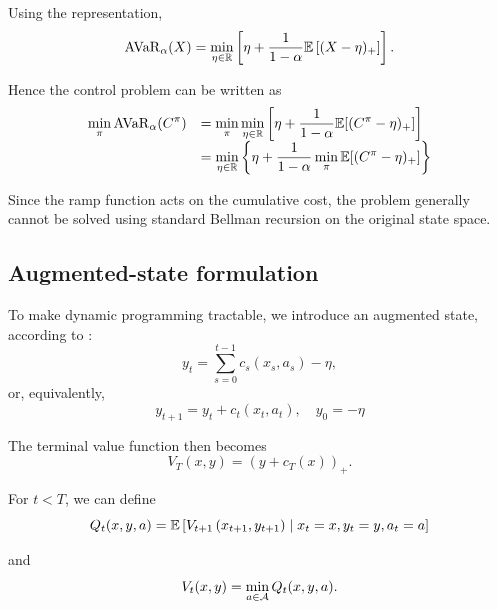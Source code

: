 Using the \cite{rockafellar-2002} representation,
\begin{equation}
	\operatorname{AVaR}_{\alpha}(X) = \min_{\eta\in\mathbb{R}} \left[ \eta + \frac{1}{1-\alpha} \mathbb{E}\left[(X-\eta)_+\right] \right].
	\label{ru-objective}
\end{equation}

Hence the control problem can be written as
\begin{equation}
	\begin{array}{rl}
		\displaystyle \min_{\pi} \operatorname{AVaR}_{\alpha} (C^{\pi}) &= \displaystyle \min_{\pi} \min_{\eta \in \mathbb{R}} \left[ \eta + \frac{1}{1 - \alpha} \mathbb{E} [(C^{\pi} - \eta)_+] \right] \\
		&= \displaystyle \min_{\eta \in \mathbb{R}} \left\{ \eta + \frac{1}{1 - \alpha} \min_{\pi} \mathbb{E} [(C^{\pi} - \eta)_+] \right\}
	\end{array}
	\label{avar-objective}
\end{equation}

Since the ramp function acts on the cumulative cost, the problem generally cannot be solved using standard Bellman recursion on the original state space.

\subsection{Augmented-state formulation}
\label{problem:augmentation}

To make dynamic programming tractable, we introduce an augmented state, according to \cite{bauerle-2011}:
\begin{equation}
	y_t = \sum_{s=0}^{t-1} c_s(x_s, a_s) - \eta,
	\label{augmented-state-sum}
\end{equation}
or, equivalently,
\begin{equation}
	y_{t+1} = y_t + c_t(x_t, a_t), \quad y_0 = -\eta
	\label{augmented-state-recursive}
\end{equation}

The terminal value function then becomes
\begin{equation}
	V_T(x, y) = (y + c_T(x))_+.
	\label{value-function-terminal}
\end{equation}

For $t<T$, we can define
\begin{equation}
	Q_t(x, y, a) = \mathbb{E} \left[ V_{t+1} \left( x_{t+1}, y_{t+1} \right) \mid x_t = x, y_t = y, a_t = a \right]
	\label{q-function}
\end{equation}

and
\begin{equation}
	V_t(x, y) = \min_{a \in \mathcal{A}} Q_t(x, y, a).
	\label{value-function}
\end{equation}

